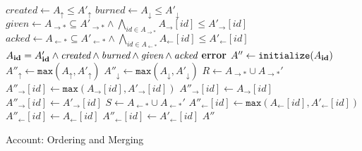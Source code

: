 \documentclass[9pt, oneside]{article}   	%
\begin{document}
\begin{algorithm}
\begin{algorithmic}[1]
     
        \State $\textit{created} \leftarrow A_\uparrow \leq A'_\uparrow$
        \State $\textit{burned} \leftarrow A_\downarrow \leq A'_\downarrow$
        \State $\textit{given} \leftarrow A_{\rightarrow *} \subseteq A'_{\rightarrow *} \wedge \bigwedge\limits_{id \in A_{\rightarrow *}} A_{\rightarrow}[id] \leq A'_{\rightarrow}[id]$ 
        \State $\textit{acked} \leftarrow A_{\leftarrow *} \subseteq A'_{\leftarrow *} \wedge \bigwedge\limits_{id \in A_{\leftarrow *}} A_{\leftarrow}[id] \leq A'_{\leftarrow}[id]$
        \State \Return $A_{\footnotesize \textbf{id}} = A'_{\footnotesize \textbf{id}} \wedge \textit{created} \wedge \textit{burned} \wedge \textit{given} \wedge \textit{acked}$
    \EndFunction
    \State
     
		\textbf{error}
	\EndIf
	\State
        \State $A'' \leftarrow \texttt{initialize}(A_{\footnotesize \textbf{id}})$
        \State $A''_\uparrow \leftarrow \texttt{max}(A_\uparrow, A'_\uparrow)$
        \State $A''_\downarrow \leftarrow \texttt{max}(A_\downarrow, A'_\downarrow)$ 
        \State
        \State $R \leftarrow A_{\rightarrow *} \cup A_{\rightarrow *}'$ 
			\State $A''_{\rightarrow}[id] \leftarrow \texttt{max}(A_{\rightarrow}[id], A'_{\rightarrow}[id])$
			\State $A''_{\rightarrow}[id] \leftarrow A_{\rightarrow}[id]$
		\Else
			\State $A''_{\rightarrow}[id] \leftarrow A'_{\rightarrow}[id]$
		\EndIf
	\EndFor
	\State
	\State $S \leftarrow A_{\leftarrow *} \cup A_{\leftarrow *}'$ 
			\State $A''_{\leftarrow}[id] \leftarrow \texttt{max}(A_{\leftarrow}[id], A'_{\leftarrow}[id])$
			\State $A''_{\leftarrow}[id] \leftarrow A_{\leftarrow}[id]$
		\Else
			\State $A''_{\leftarrow}[id] \leftarrow A'_{\leftarrow}[id]$
		\EndIf
	\EndFor
	\State
	\State \Return $A''$	
    \EndFunction
\end{algorithmic}
\caption{\label{alg:account-ordering} Account: Ordering and Merging}
\end{algorithm}
\end{document}
